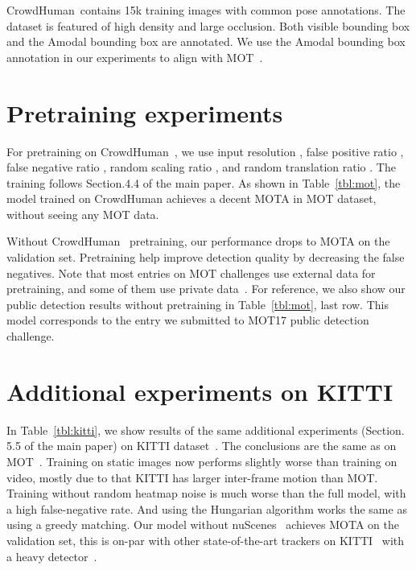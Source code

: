 \documentclass[runningheads]{llncs}
\newcommand{\reftab}[1]{Table~\ref{tbl:#1}}
\begin{document}
CrowdHuman~\cite{shao2018crowdhuman}contains 15k training images with common pose annotations.
The dataset is featured of high density and large occlusion. Both visible bounding box and the Amodal bounding box are annotated. We use the Amodal bounding box annotation in our experiments to align with MOT~\cite{MOT16}.

\section{Pretraining experiments}

For pretraining on CrowdHuman~\cite{shao2018crowdhuman}, we use input resolution , false positive ratio , false negative ratio , random scaling ratio , and random translation ratio . The training follows Section.4.4 of the main paper. As shown in \reftab{mot}, the model trained on CrowdHuman achieves a decent  MOTA in MOT dataset, without seeing any MOT data.

Without CrowdHuman~\cite{shao2018crowdhuman} pretraining, our performance drops to  MOTA on the validation set. Pretraining help improve detection quality by decreasing the false negatives. Note that most entries on MOT challenges use external data for pretraining, and some of them use private data~\cite{yu2016poi}.
For reference, we also show our public detection results without pretraining in \reftab{mot}, last row. This model corresponds to the entry we submitted to MOT17 public detection challenge.

\section{Additional experiments on KITTI}

In \reftab{kitti}, we show results of the same additional experiments (Section. 5.5 of the main paper) on KITTI dataset~\cite{Geiger2012CVPR}. The conclusions are the same as on MOT~\cite{MOT16}.
Training on static images now performs slightly worse than training on video, mostly due to that KITTI has larger inter-frame motion than MOT. Training without random heatmap noise is much worse than the full model, with a high false-negative rate. And using the Hungarian algorithm works the same as using a greedy matching.
Our model without nuScenes~\cite{nuscenes2019} achieves  MOTA on the validation set, this is on-par with other state-of-the-art trackers on KITTI~\cite{Hu3DT19,sharma2018beyond,Weng2019_3dmot} with a heavy detector~\cite{ren2017accurate}.
\end{document}
